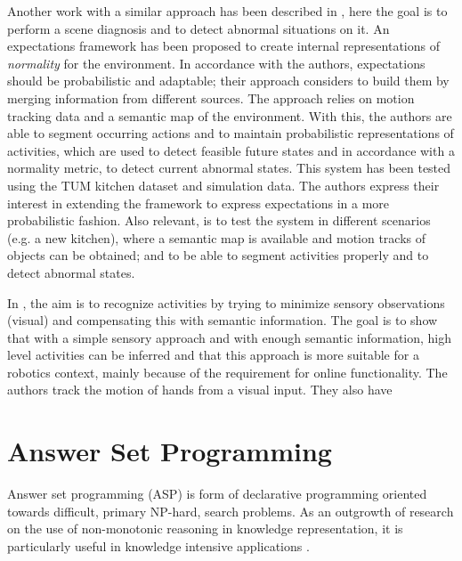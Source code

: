 Another work with a similar approach has been described in \citep{karg13expectations,karg13simultaneous,karg11towards,karg12acquisition}, here the goal is to perform a scene diagnosis and to detect abnormal situations on it.
An expectations framework has been proposed to create internal representations of \textit{normality} for the environment.
In accordance with the authors, expectations should be probabilistic and adaptable; their approach considers to build them by merging information from different sources.
The approach relies on motion tracking data and a semantic map of the environment.
With this, the authors are able to segment occurring actions and to maintain probabilistic representations of activities, which are used to detect feasible future states and in accordance with a normality metric, to detect current abnormal states.
This system has been tested using the TUM kitchen dataset \citep{Tenorth2009_TUMKData} and simulation data.
The authors express their interest in extending the framework to express expectations in a more probabilistic fashion.
Also relevant, is to test the system in different scenarios (e.g. a new kitchen), where a semantic map is available and motion tracks of objects can be obtained; and to be able to segment activities properly and to detect abnormal states.

In \citep{ramirez14Iros}, the aim is to recognize activities by trying to minimize sensory observations (visual) and compensating this with semantic information. 
The goal is to show that with a simple sensory approach and with enough semantic information, high level activities can be inferred and that this approach is more suitable for a robotics context, mainly because of the requirement for online functionality.
The authors track the motion of hands from a visual input. 
They also have 









\section{Answer Set Programming} %

Answer set programming (ASP) is form of declarative programming oriented towards difficult, primary NP-hard, search problems.
As an outgrowth of research on the use of non-monotonic reasoning in knowledge representation, it is particularly useful in knowledge intensive applications \citep{Lifschitz2008_WhatASP}. 

